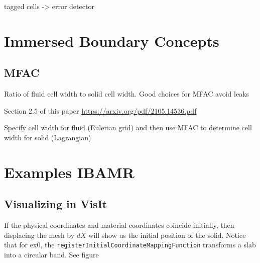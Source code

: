 \documentclass[12pt,a4paper,twoside]{article}
\begin{document}
tagged cells -> error detector


\section{Immersed Boundary Concepts}
\subsection{MFAC}
Ratio of fluid cell width to solid cell width. Good choices for MFAC avoid leaks

Section 2.5 of this paper
\url{https://arxiv.org/pdf/2105.14536.pdf}

Specify cell width for fluid (Eulerian grid) and then use MFAC to determine cell width for solid (Lagrangian)

\section{Examples IBAMR}
\subsection{Visualizing in VisIt}
If the physical coordinates and material coordinates coincide initially, then displacing the mesh by $dX$ will show us the initial position of the solid.
Notice that for ex0, the \texttt{registerInitialCoordinateMappingFunction} transforms a slab into a circular band. See figure   
\end{document}
